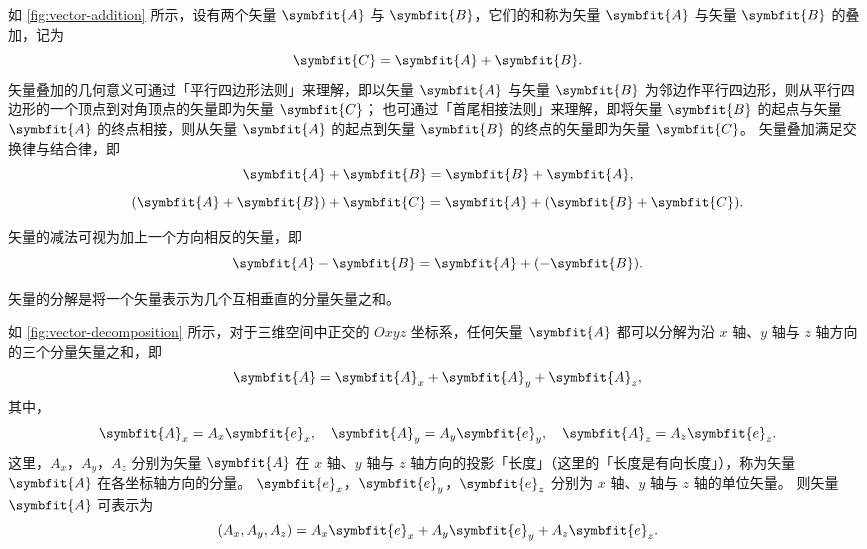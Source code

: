 如 \cref{fig:vector-addition} 所示，设有两个矢量 $ \symbfit{A} $ 与 $ \symbfit{B} $，它们的和称为矢量 $ \symbfit{A} $ 与矢量 $ \symbfit{B} $ 的叠加，记为
\begin{equation}
    \symbfit{C} = \symbfit{A} + \symbfit{B} .
\end{equation}
矢量叠加的几何意义可通过「平行四边形法则」来理解，即以矢量 $ \symbfit{A} $ 与矢量 $ \symbfit{B} $ 为邻边作平行四边形，则从平行四边形的一个顶点到对角顶点的矢量即为矢量 $ \symbfit{C} $；
也可通过「首尾相接法则」来理解，即将矢量 $ \symbfit{B} $ 的起点与矢量 $ \symbfit{A} $ 的终点相接，则从矢量 $ \symbfit{A} $ 的起点到矢量 $ \symbfit{B} $ 的终点的矢量即为矢量 $ \symbfit{C} $。
矢量叠加满足交换律与结合律，即
\begin{equation}
    \symbfit{A} + \symbfit{B} = \symbfit{B} + \symbfit{A} ,
\end{equation}
\begin{equation}
    (\symbfit{A} + \symbfit{B}) + \symbfit{C} = \symbfit{A} + (\symbfit{B} + \symbfit{C}) .
\end{equation}

矢量的减法可视为加上一个方向相反的矢量，即
\begin{equation}
    \symbfit{A} - \symbfit{B} = \symbfit{A} + (-\symbfit{B}) .
\end{equation}

\bigskip

矢量的分解是将一个矢量表示为几个互相垂直的分量矢量之和。


如 \cref{fig:vector-decomposition} 所示，对于三维空间中正交的 $ Oxyz $ 坐标系，任何矢量 $ \symbfit{A} $ 都可以分解为沿 $ x $ 轴、$ y $ 轴与 $ z $ 轴方向的三个分量矢量之和，即
\begin{equation}
    \symbfit{A} = \symbfit{A}_x + \symbfit{A}_y + \symbfit{A}_z ,
\end{equation}
其中，
\begin{equation}
    \symbfit{A}_x = A_x \symbfit{e}_x , \quad \symbfit{A}_y = A_y \symbfit{e}_y , \quad \symbfit{A}_z = A_z \symbfit{e}_z .
\end{equation}
这里，$ A_x $，$ A_y $，$ A_z $ 分别为矢量 $ \symbfit{A} $ 在 $ x $ 轴、$ y $ 轴与 $ z $ 轴方向的投影「长度」（这里的「长度是有向长度」），称为矢量 $ \symbfit{A} $ 在各坐标轴方向的分量。
$ \symbfit{e}_x $，$ \symbfit{e}_y $，$ \symbfit{e}_z $ 分别为 $ x $ 轴、$ y $ 轴与 $ z $ 轴的单位矢量。
则矢量 $ \symbfit{A} $ 可表示为
\begin{equation}
    (A_x , A_y , A_z) = A_x \symbfit{e}_x + A_y \symbfit{e}_y + A_z \symbfit{e}_z .
\end{equation}

